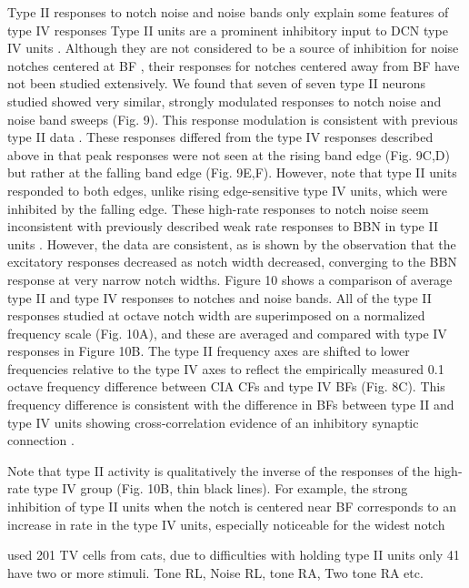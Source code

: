 \documentclass[10pt,a4paper]{article}
\begin{document}
Type II responses to notch noise and noise bands only explain some features of
type IV responses Type II units are a prominent inhibitory input to DCN type IV
units \citep{VoigtYoung:1990}. Although they are not considered to be a source
of inhibition for noise notches centered at BF \citep{NelkenYoung:1994}, their
responses for notches centered away from BF have not been studied extensively.
We found that seven of seven type II neurons studied showed very similar,
strongly modulated responses to notch noise and noise band sweeps (Fig. 9). This
response modulation is consistent with previous type II data
\citep{NelkenYoung:1994}.  These responses differed from the type IV responses
described above in that peak responses were not seen at the rising band edge
(Fig. 9C,D) but rather at the falling band edge (Fig. 9E,F). However, note that
type II units responded to both edges, unlike rising edge-sensitive type IV
units, which were inhibited by the falling edge.  These high-rate responses to
notch noise seem inconsistent with previously described weak rate responses to
BBN in type II units \citep{YoungVoigt:1982,SpirouDavisEtAl:1999}. However, the
data are consistent, as is shown by the observation that the excitatory
responses decreased as notch width decreased, converging to the BBN response at
very narrow notch widths.  Figure 10 shows a comparison of average type II and
type IV responses to notches and noise bands. All of the type II responses
studied at octave notch width are superimposed on a normalized frequency scale
(Fig. 10A), and these are averaged and compared with type IV responses in Figure
10B. The type II frequency axes are shifted to lower frequencies relative to the
type IV axes to reflect the empirically measured 0.1 octave frequency difference
between CIA CFs and type IV BFs (Fig. 8C). This frequency difference is
consistent with the difference in BFs between type II and type IV units showing
cross-correlation evidence of an inhibitory synaptic connection
\citep{VoigtYoung:1990}.

Note that type II activity is qualitatively the inverse of the responses of the
high-rate type IV group (Fig. 10B, thin black lines). For example, the strong
inhibition of type II units when the notch is centered near BF corresponds to an
increase in rate in the type IV units, especially noticeable for the widest
notch


\citep{SpirouDavisEtAl:1999} used 201 TV cells from cats, due to difficulties
with holding type II units only 41 have two or more stimuli.  Tone RL, Noise RL,
tone RA, Two tone RA etc.
\end{document}
